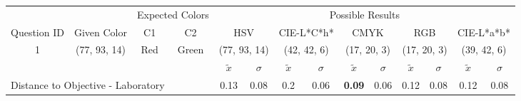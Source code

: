%
\begin{table}[H]
  \resizebox{\textwidth}{!} {
  \begin{tabular}{lccccccccccccc}
    \hline
    \multicolumn{1}{c}{}                              &                                      & \multicolumn{2}{c}{Expected Colors}                   & \multicolumn{10}{c}{Possible Results}                                                                                                                                                                                                                                                                                        \\ \cline{3-14}
    \multicolumn{1}{c}{\multirow{-2}{*}{Question ID}} & \multirow{-2}{*}{Given Color}        & C1                       & C2                         & \multicolumn{2}{c}{HSV}                                        & \multicolumn{2}{c}{CIE-L*C*h*}                                 & \multicolumn{2}{c}{CMYK}                                       & \multicolumn{2}{c}{RGB}                                        & \multicolumn{2}{c}{CIE-L*a*b*}                                 \\ \hline
    \multicolumn{1}{c}{1}                             & \cellcolor[HTML]{FFFF00}(77, 93, 14) & \multicolumn{1}{c|}{Red} & \multicolumn{1}{c|}{Green} & \multicolumn{2}{c|}{\cellcolor[HTML]{FFFF00}(77, 93, 14)}      & \multicolumn{2}{c|}{\cellcolor[HTML]{D7A700}(42, 42, 6)}       & \multicolumn{2}{c|}{\cellcolor[HTML]{808000}(17, 20, 3)}       & \multicolumn{2}{c|}{\cellcolor[HTML]{808000}(17, 20, 3)}       & \multicolumn{2}{c|}{\cellcolor[HTML]{C9AB00}(39, 42, 6)}       \\ \hline
                                                      & \multicolumn{1}{l}{}                 & \multicolumn{1}{l}{}     & \multicolumn{1}{l}{}       & \multicolumn{1}{c}{$\tilde{x}$} & \multicolumn{1}{c}{$\sigma$} & \multicolumn{1}{c}{$\tilde{x}$} & \multicolumn{1}{c}{$\sigma$} & \multicolumn{1}{c}{$\tilde{x}$} & \multicolumn{1}{c}{$\sigma$} & \multicolumn{1}{c}{$\tilde{x}$} & \multicolumn{1}{c}{$\sigma$} & \multicolumn{1}{c}{$\tilde{x}$} & \multicolumn{1}{c}{$\sigma$} \\ \hline
    \multicolumn{4}{l}{Distance to Objective - Laboratory}                                                                                           & \multicolumn{1}{|c}{0.13}       & \multicolumn{1}{c|}{0.08}    & \multicolumn{1}{|c}{0.2}        & \multicolumn{1}{c|}{0.06}    & \multicolumn{1}{|c}{\textbf{0.09}}       & \multicolumn{1}{c|}{0.06}    & \multicolumn{1}{|c}{0.12}       & \multicolumn{1}{c|}{0.08}    & \multicolumn{1}{|c}{0.12}       & \multicolumn{1}{c|}{0.08}    \\

\end{tabular}}
\end{table}
